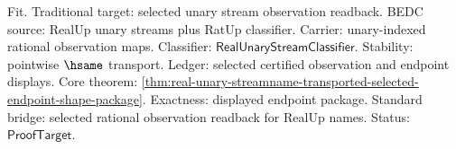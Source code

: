 
Fit. Traditional target: selected unary stream observation readback. BEDC source:
RealUp unary streams plus RatUp classifier. Carrier: unary-indexed rational
observation maps. Classifier: $\mathsf{RealUnaryStreamClassifier}$. Stability:
pointwise $\hsame$ transport. Ledger: selected certified observation and endpoint
displays. Core theorem:
\autoref{thm:real-unary-streamname-transported-selected-endpoint-shape-package}.
Exactness: displayed endpoint package. Standard bridge: selected rational
observation readback for RealUp names. Status: $\mathsf{ProofTarget}$.

